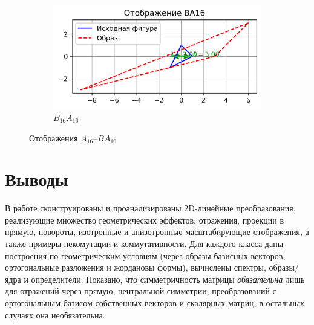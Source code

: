 \begin{figure}[H]
  \vspace{0.5cm}

  \begin{subfigure}[b]{0.3\textwidth}
    \includegraphics[width=\linewidth]{plots/BA16.png}
    \caption{$B_{16}A_{16}$}
  \end{subfigure}
  \caption{Отображения $A_{16}$–$BA_{16}$}
\end{figure}

\clearpage

\section*{Выводы}
В работе сконструированы и проанализированы 2D-линейные преобразования, реализующие множество геометрических эффектов: отражения, проекции в прямую, повороты, изотропные и анизотропные масштабирующие отображения, а также примеры некомутации и коммутативности. Для каждого класса даны построения по геометрическим условиям (через образы базисных векторов, ортогональные разложения и жордановы формы), вычислены спектры, образы/ядра и определители. Показано, что симметричность матрицы \emph{обязательна} лишь для отражений через прямую, центральной симметрии, преобразований с ортогональным базисом собственных векторов и скалярных матриц; в остальных случаях она необязательна.